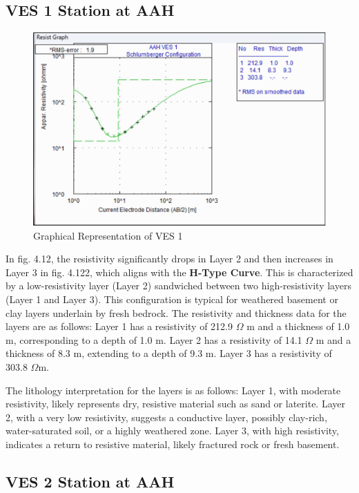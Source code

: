 \documentclass[12pt,a4paper]{report}
\begin{document}
\subsection{VES 1 Station at AAH}

\begin{figure}[H]
    \centering
    \includegraphics[width=1.0\textwidth]{aah_ves1.png}
    \caption{Graphical Representation of VES 1}
    \label{fig:AAH_VES_1_Curve}
\end{figure}

In fig. 4.12, the resistivity significantly drops in Layer 2 and then increases in Layer 3  in fig. 4.122, which aligns with the \textbf{H-Type Curve}. This is characterized by a low-resistivity layer (Layer 2) sandwiched between two high-resistivity layers (Layer 1 and Layer 3). This configuration is typical for weathered basement or clay layers underlain by fresh bedrock. The resistivity and thickness data for the layers are as follows: Layer 1 has a resistivity of 212.9 $\Omega$ m and a thickness of 1.0 m, corresponding to a depth of 1.0 m. Layer 2 has a resistivity of 14.1 $\Omega$ m and a thickness of 8.3 m, extending to a depth of 9.3 m. Layer 3 has a resistivity of 303.8 $\Omega$m.

The lithology interpretation for the layers is as follows: Layer 1, with moderate resistivity, likely represents dry, resistive material such as sand or laterite. Layer 2, with a very low resistivity, suggests a conductive layer, possibly clay-rich, water-saturated soil, or a highly weathered zone. Layer 3, with high resistivity, indicates a return to resistive material, likely fractured rock or fresh basement.

\subsection{VES 2 Station at AAH}
\end{document}
